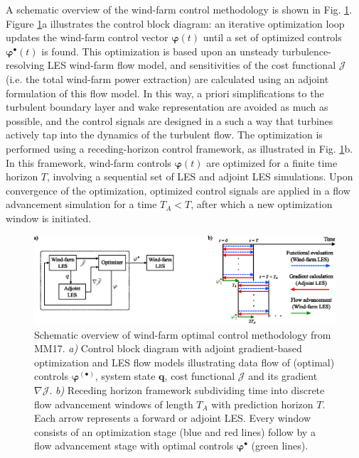 \documentclass[wes, manuscript]{copernicus}
\newcommand{\bs}[1]{\boldsymbol{#1}}
\newcommand{\J}{\mathscr{J}}
\begin{document}
A schematic overview of the wind-farm control methodology is shown in Fig. \ref{fig:optimization_meth}. Figure \ref{fig:optimization_meth}a illustrates the control block diagram: an iterative optimization loop updates the wind-farm control vector $\bs{\varphi}(t)$ until a set of optimized controls $\bs{\varphi}^{\bullet}(t)$ is found. This optimization is based upon an unsteady turbulence-resolving LES wind-farm flow model, and sensitivities of the cost functional $\J$ (i.e. the total wind-farm power extraction) are calculated using an adjoint formulation of this flow model. In this way, a priori simplifications to the turbulent boundary layer and wake representation are avoided as much as possible, and the control signals are designed in a such a way that turbines actively tap into the dynamics of the turbulent flow. The optimization is performed using a receding-horizon control framework, as illustrated in Fig. \ref{fig:optimization_meth}b. In this framework, wind-farm controls $\bs{\varphi}(t)$ are optimized for a finite time horizon $T$, involving a sequential set of LES and adjoint LES simulations. Upon convergence of the optimization, optimized control signals are applied in a flow advancement simulation for a time $T_A < T$, after which a new optimization window is initiated. 

\begin{figure}
	\includegraphics[width=\textwidth]{figure1.eps}
	\caption{Schematic overview of wind-farm optimal control methodology from MM17. \emph{a)} Control block diagram with adjoint gradient-based optimization and LES flow models illustrating data flow of (optimal) controls $\bs{\varphi}^{(\bullet)}$, system state $\bs{q}$, cost functional $\J$ and its gradient $\nabla \J$. \emph{b)} Receding horizon framework subdividing time into discrete flow advancement windows of length $T_A$ with prediction horizon $T$. Each arrow represents a forward or adjoint LES. Every window consists of an optimization stage (blue and red lines) follow by a flow advancement stage with optimal controls $\bs{\varphi}^{\bullet}$ (green lines).  \label{fig:optimization_meth}}
\end{figure}
\end{document}

